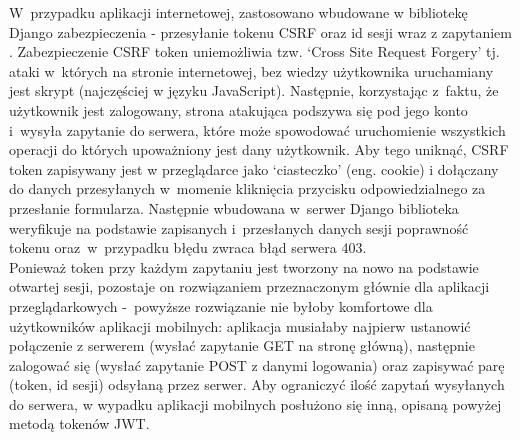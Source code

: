 W~przypadku aplikacji internetowej, zastosowano wbudowane w bibliotekę Django zabezpieczenia - przesyłanie tokenu CSRF oraz id sesji wraz z zapytaniem \cite{djangoCSRF}. Zabezpieczenie CSRF token uniemożliwia tzw. `Cross Site Request Forgery' tj. ataki w~których na stronie internetowej, bez wiedzy użytkownika uruchamiany jest skrypt (najczęściej w języku JavaScript). Następnie, korzystając z~faktu, że użytkownik jest zalogowany, strona atakująca podszywa się pod jego konto i~wysyła zapytanie do serwera, które może spowodować uruchomienie wszystkich operacji do których upoważniony jest dany użytkownik. Aby tego uniknąć, CSRF token zapisywany jest w przeglądarce jako `ciasteczko' (eng. cookie) i dołączany do danych przesyłanych w~momenie kliknięcia przycisku odpowiedzialnego za przesłanie formularza. Następnie wbudowana w~serwer Django biblioteka weryfikuje na podstawie zapisanych i~przesłanych danych sesji poprawność tokenu oraz~w~przypadku błędu zwraca błąd serwera 403.
\\Ponieważ token przy każdym zapytaniu jest tworzony na nowo na podstawie otwartej sesji, pozostaje on rozwiązaniem przeznaczonym głównie dla aplikacji przeglądarkowych -~powyższe rozwiązanie nie byłoby komfortowe dla użytkowników aplikacji mobilnych: aplikacja musiałaby najpierw ustanowić połączenie z serwerem (wysłać zapytanie GET na stronę główną), następnie zalogować się (wysłać zapytanie POST z danymi logowania) oraz zapisywać parę (token, id sesji) odsyłaną przez serwer. Aby ograniczyć ilość zapytań wysyłanych do serwera, w wypadku aplikacji mobilnych posłużono się inną, opisaną powyżej metodą tokenów JWT.
